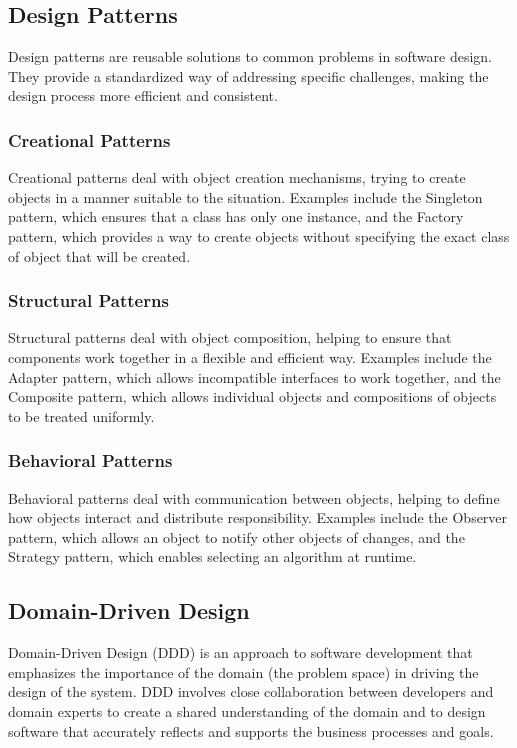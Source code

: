 \begin{refsection}
\begin{multicols}{2}
{\subsection{Design Patterns}

Design patterns are reusable solutions to common problems in software design. They provide a standardized way of addressing specific challenges, making the design process more efficient and consistent.

\subsubsection{Creational Patterns}

Creational patterns deal with object creation mechanisms, trying to create objects in a manner suitable to the situation. Examples include the Singleton pattern, which ensures that a class has only one instance, and the Factory pattern, which provides a way to create objects without specifying the exact class of object that will be created.

\subsubsection{Structural Patterns}

Structural patterns deal with object composition, helping to ensure that components work together in a flexible and efficient way. Examples include the Adapter pattern, which allows incompatible interfaces to work together, and the Composite pattern, which allows individual objects and compositions of objects to be treated uniformly.

\subsubsection{Behavioral Patterns}

Behavioral patterns deal with communication between objects, helping to define how objects interact and distribute responsibility. Examples include the Observer pattern, which allows an object to notify other objects of changes, and the Strategy pattern, which enables selecting an algorithm at runtime.

\subsection{Domain-Driven Design}

Domain-Driven Design (DDD) is an approach to software development that emphasizes the importance of the domain (the problem space) in driving the design of the system. DDD involves close collaboration between developers and domain experts to create a shared understanding of the domain and to design software that accurately reflects and supports the business processes and goals.

}
\end{multicols}
\end{refsection}
